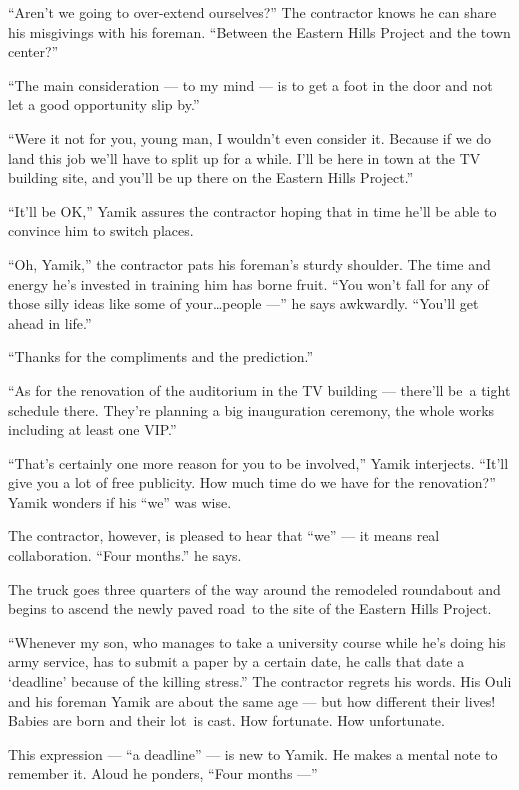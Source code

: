 \documentclass[twoside,11pt]{book}
\begin{document}
``Aren't we going to over-extend ourselves?'' The contractor knows he can share his misgivings
with his foreman. ``Between the Eastern Hills Project and the town center?''

``The main consideration --- to my mind --- is to get a foot in the door and not let a good opportunity slip
by.''

``Were it not for you, young man, I wouldn't even consider it. Because if we do land this job we'll have to
split up for a while. I'll be here in town at the TV building site, and you'll be up there on the Eastern Hills
Project.''

``It'll be OK,'' Yamik assures the contractor hoping that in time he'll be able to convince
him to switch places.

``Oh, Yamik,'' the contractor pats his foreman's sturdy shoulder. The time and energy he's
invested in training him has borne fruit. ``You won't fall for any of those silly ideas like some of
your{\ldots}people ---'' he says awkwardly. ``You'll get ahead in life.''

``Thanks for the compliments and the prediction.''

``As for the renovation of the auditorium in the TV building --- there'll be~a tight schedule there. They're
planning a big inauguration ceremony, the whole works including at least one VIP.''

``That's certainly one more reason for you to be involved,'' Yamik interjects.
``It'll give you a lot of free publicity. How much time do we have for the renovation?''
Yamik wonders if his ``we'' was wise.

The contractor, however, is pleased to hear that ``we'' --- it means real collaboration. ``Four
months.'' he says.

The truck goes three quarters of the way around the remodeled roundabout and begins to ascend the newly paved road~to
the site of the Eastern Hills Project.

``Whenever my son, who manages{ }to take a university course while he's doing his army
service, has to submit a paper by a certain date, he calls that date a `deadline' because of the killing
stress.'' The contractor regrets his words. His Ouli and his foreman Yamik are about the same age --- but
how different their lives! Babies are born and their lot~is cast. How fortunate. How unfortunate.

This expression --- ``a deadline'' --- is new to Yamik. He makes a mental note to remember it.
Aloud he ponders, ``Four months ---''
\end{document}
